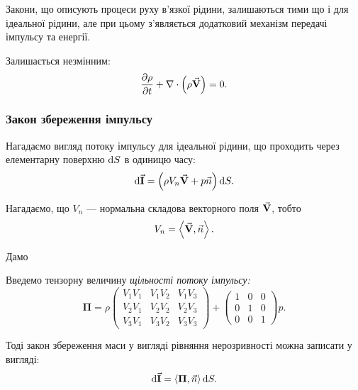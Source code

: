 Закони, що описують процеси руху в'язкої рідини, залишаються тими що і для ідеальної рідини, але при цьому з'являється додатковий механізм передачі імпульсу та енергії. \medskip

\begin{law}
	Залишається незмінним:
	\begin{equation}
		\frac{\partial \rho}{\partial t} + \nabla \cdot \Big(\rho {\vec{\mathbf{V}}}\Big) = 0.		
	\end{equation}
\end{law}

\subsubsection{Закон збереження імпульсу}

Нагадаємо вигляд потоку імпульсу для ідеальної рідини, що проходить через елементарну поверхню $\mathop{}\!\mathrm{d} S$ в одиницю часу:
\begin{equation}
	\mathop{}\!\mathrm{d} {\vec{\mathbf{I}}} = \Big(\rho V_n {\vec{\mathbf{V}}} + p \vec n \Big) \mathop{}\!\mathrm{d} S.
\end{equation}

\begin{remark}
	Нагадаємо, що $V_n$ --- нормальна складова векторного поля ${\vec{\mathbf{V}}}$, тобто
	\begin{equation}
		V_n = \langle \vecf V, \vec n \rangle.
	\end{equation}
\end{remark}

Дамо
\begin{definition}
	Введемо тензорну величину \it{щільності потоку імпульсу}:
	\begin{equation}
		\bm{\Pi} = \rho 
		\begin{pmatrix}
			V_1 V_1 & V_1 V_2 & V_1 V_3 \\
			V_2 V_1 & V_2 V_2 & V_2 V_3 \\
			V_3 V_1 & V_3 V_2 & V_3 V_3
		\end{pmatrix}
		+
		\begin{pmatrix}
			1 & 0 & 0 \\
			0 & 1 & 0 \\
			0 & 0 & 1
		\end{pmatrix}
		p.
	\end{equation}
\end{definition}

Тоді закон збереження маси у вигляді рівняння нерозривності можна записати у вигляді: 
\begin{equation}
	\diff \vecf I = \langle \bm{\Pi}, \vec n \rangle \diff S.
\end{equation}

